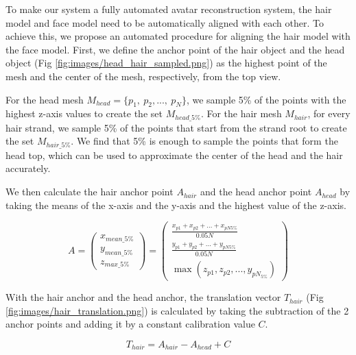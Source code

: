 To make our system a fully automated avatar reconstruction system, the hair model and face model need to be automatically aligned with each other. To achieve this, we propose an automated procedure for aligning the hair model with the face model.
First, we define the anchor point of the hair object and the head object (Fig \ref{fig:images/head_hair_sampled.png}) as the highest point of the mesh and the center of the mesh, respectively, from the top view.

For the head mesh $M_{head}=\{p_1,\ p_2,...,\ p_N\}$, we sample 5\% of the points with the highest z-axis values to create the set $M_{head\_5\%}$. For the hair mesh $M_{hair}$, for every hair strand, we sample 5\% of the points that start from the strand root to create the set $M_{hair\_5\%}$. We find that 5\% is enough to sample the points that form the head top, which can be used to approximate the center of the head and the hair accurately.


We then calculate the hair anchor point $A_{hair}$ and the head anchor point $A_{head}$ by taking the means of the x-axis and the y-axis and the highest value of the z-axis.

\begin{equation}
    A = \begin{pmatrix}
        x_{mean\_5\%} \\
        y_{mean\_5\%} \\
        z_{max\_5\%}
    \end{pmatrix}
    = \begin{pmatrix}
        \frac{x_{p1}+x_{p2}+...+x_{pN5\%}}{0.05N} \\
        \frac{y_{p1}+y_{p2}+...+y_{pN5\%}}{0.05N} \\
        \max(z_{p1},z_{p2},...,y_{pN_{5\%}})
    \end{pmatrix}
\end{equation}

With the hair anchor and the head anchor, the translation vector $T_{hair}$ (Fig \ref{fig:images/hair_translation.png}) is calculated by taking the subtraction of the 2 anchor points and adding it by a constant calibration value $C$.

\begin{equation}
    T_{hair} = A_{hair} - A_{head} + C
\end{equation}

